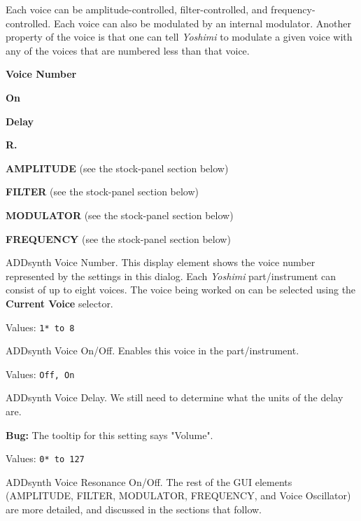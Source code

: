    Each voice can be amplitude-controlled, filter-controlled, and
   frequency-controlled.  Each voice can also be modulated by an
   internal modulator.
   Another property of the voice is that one can tell \textsl{Yoshimi}
   to modulate a given voice with any of the voices that are numbered less
   than that voice.

   \begin{enumber}
      \item \textbf{Voice Number}
      \item \textbf{On}
      \item \textbf{Delay}
      \item \textbf{R.}
      \item \textbf{AMPLITUDE} (see the stock-panel section below)
      \item \textbf{FILTER} (see the stock-panel section below)
      \item \textbf{MODULATOR} (see the stock-panel section below)
      \item \textbf{FREQUENCY} (see the stock-panel section below)
   \end{enumber}

   \setcounter{ItemCounter}{0}      %

   ADDsynth Voice Number.
   This display element shows the voice number represented by the settings
   in this dialog.  Each \textsl{Yoshimi} part/instrument can consist of up
   to eight voices.
   The voice being worked on can be selected using the
   \textbf{Current Voice} selector.

   Values: \texttt{1* to 8}

   ADDsynth Voice On/Off.
   Enables this voice in the part/instrument.

   Values: \texttt{Off, On}

   ADDsynth Voice Delay.
   We still need to determine what the units of the delay are.

   \textbf{Bug:}
   The tooltip for this setting says "Volume".

   Values: \texttt{0* to 127}

   ADDsynth Voice Resonance On/Off.
   The rest of the GUI elements
   (AMPLITUDE, FILTER, MODULATOR, FREQUENCY, and Voice Oscillator)
   are more detailed, and discussed in the sections that follow.

